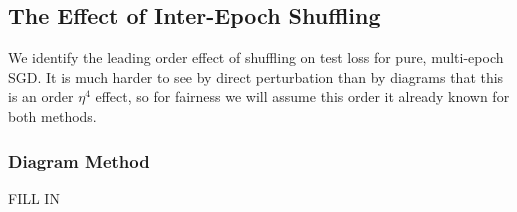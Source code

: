 \documentclass{article}
\begin{document}

    \subsection{The Effect of Inter-Epoch Shuffling}
        We identify the leading order effect of shuffling on test loss for
        pure, multi-epoch SGD.  It is much harder to see by direct perturbation
        than by diagrams that this is an order $\eta^4$ effect, so for fairness
        we will assume this order it already known for both methods.

        \subsubsection*{Diagram Method}

            {\color{moor} FILL IN}
            
\end{document}

